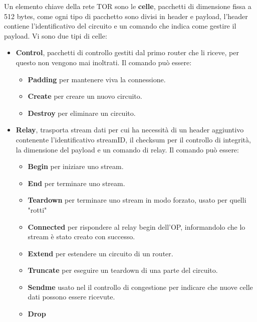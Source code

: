 Un elemento chiave della rete TOR sono le \textbf{celle}, pacchetti di dimensione fissa a 512 bytes, come ogni tipo di pacchetto sono divisi in header e payload, l'header contiene l'identificativo del circuito e un comando che indica come gestire il payload. Vi sono due tipi di celle:
\begin{itemize}
    \item \textbf{Control}, pacchetti di controllo gestiti dal primo router che li riceve, per questo non vengono mai inoltrati. Il comando può essere:
    \begin{itemize}
        \item \textbf{Padding} per mantenere viva la connessione.
        \item \textbf{Create} per creare un nuovo circuito.
        \item \textbf{Destroy} per eliminare un circuito.
    \end{itemize}
    \item \textbf{Relay}, trasporta stream dati per cui ha necessità di un header aggiuntivo contenente l'identificativo streamID, il checksum per il controllo di integrità, la dimensione del payload e un comando di relay. Il comando può essere:
    \begin{itemize}
        \item \textbf{Begin} per iniziare uno stream.
        \item \textbf{End} per terminare uno stream.
        \item \textbf{Teardown} per terminare uno stream in modo forzato, usato per quelli "rotti"
        \item \textbf{Connected} per rispondere al relay begin dell'OP, informandolo che lo stream è stato creato con successo.
        \item \textbf{Extend} per estendere un circuito di un router.
        \item \textbf{Truncate} per eseguire un teardown di una parte del circuito.
        \item \textbf{Sendme} usato nel il controllo di congestione per indicare che nuove celle dati possono essere ricevute.
        \item \textbf{Drop} 
    \end{itemize}
\end{itemize}

